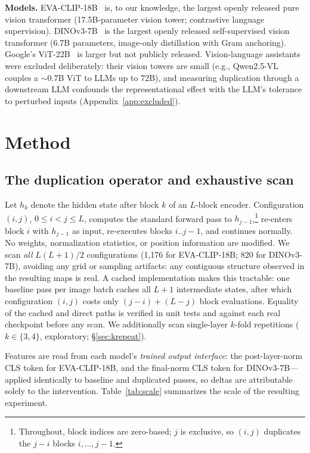 \documentclass{article}
\newcommand{\eva}{EVA-CLIP-18B}
\newcommand{\dino}{DINOv3-7B}
\begin{document}
\textbf{Models.} \eva{}~\citep{sun2024evaclip} is, to our knowledge, the
largest openly released pure vision transformer (17.5B-parameter vision
tower; contrastive language supervision). \dino{}~\citep{simeoni2025dinov3}
is the largest openly released self-supervised vision transformer
(6.7B parameters, image-only distillation with Gram anchoring). Google's
ViT-22B~\citep{dehghani2023scaling} is larger but not publicly released.
Vision-language assistants were excluded deliberately: their vision
towers are small (e.g., Qwen2.5-VL couples a $\sim$0.7B ViT to LLMs up to
72B), and measuring duplication through a downstream LLM confounds the
representational effect with the LLM's tolerance to perturbed inputs
(Appendix~\ref{app:excluded}).

\section{Method}
\label{sec:method}

\subsection{The duplication operator and exhaustive scan}
\label{sec:operator}

Let $h_k$ denote the hidden state after block $k$ of an $L$-block
encoder. Configuration $(i,j)$, $0 \le i < j \le L$, computes the
standard forward pass to $h_{j-1}$,\footnote{Throughout, block indices
are zero-based; $j$ is exclusive, so $(i,j)$ duplicates the $j{-}i$
blocks $i,\dots,j{-}1$.} re-enters block $i$ with $h_{j-1}$ as input,
re-executes blocks $i..j{-}1$, and continues normally. No weights,
normalization statistics, or position information are modified. We scan
\emph{all} $L(L{+}1)/2$ configurations (1{,}176 for \eva{}; 820 for
\dino{}), avoiding any grid or sampling artifacts: any contiguous
structure observed in the resulting maps is real. A cached implementation
makes this tractable: one baseline pass per image batch caches all $L{+}1$
intermediate states, after which configuration $(i,j)$ costs only
$(j{-}i) + (L{-}j)$ block evaluations. Equality of the cached and direct
paths is verified in unit tests and against each real checkpoint before
any scan. We additionally scan single-layer $k$-fold repetitions
($k \in \{3,4\}$, exploratory; \S\ref{sec:krepeat}).

Features are read from each model's \emph{trained output interface}: the
post-layer-norm CLS token for \eva{}, and the final-norm CLS token for
\dino{}---applied identically to baseline and duplicated passes, so
deltas are attributable solely to the intervention.
Table~\ref{tab:scale} summarizes the scale of the resulting experiment.
\end{document}

